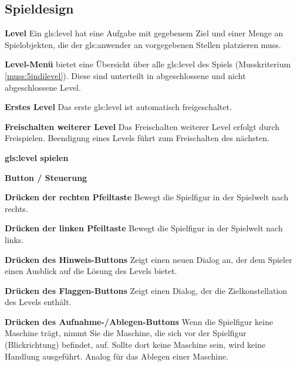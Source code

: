 \documentclass{scrartcl}
\begin{document}
\subsection{Spieldesign}

\begin{falist}[resume]
	\item \label{fa:level} \textbf{Level} Ein \gls{gls:level} hat eine Aufgabe mit gegebenem Ziel und einer Menge an Spielobjekten, die der \gls{gls:anwender} an vorgegebenen Stellen platzieren muss.
	\item \label{fa:levelmenue} \textbf{Level-Menü} bietet eine Übersicht über alle \gls{gls:level} des Spiels (Musskriterium \ref{muss:5indilevel}). Diese sind unterteilt in abgeschlossene und nicht abgeschlossene Level.
    \begin{falist}
        \item \textbf{Erstes Level} Das erste \gls{gls:level} ist automatisch freigeschaltet.
        \item \textbf{Freischalten weiterer Level} Das Freischalten weiterer Level erfolgt durch Freispielen. Beendigung eines Levels führt zum Freischalten des nächsten.
    \end{falist}
    \item \label{fa:spielen} \textbf{\gls{gls:level} spielen}
    \item \label{fa:buttons_muss} \textbf{Button / Steuerung}
    \begin{falist}
    	\item \label{fa:button_rechts_kreuz} \textbf{Drücken der rechten Pfeiltaste} Bewegt die Spielfigur in der Spielwelt nach rechts.
    	\item \label{fa:button_links_kreuz} \textbf{Drücken der linken Pfeiltaste} Bewegt die Spielfigur in der Spielwelt nach links.
    	\item \label{fa:button_lampe} \textbf{Drücken des Hinweis-Buttons} Zeigt einen neuen Dialog an, der dem Spieler einen Ausblick auf die Lösung des Levels bietet.
    	\item \label{fa:button_flagge} \textbf{Drücken des Flaggen-Buttons} Zeigt einen Dialog, der die Zielkonstellation des Levels enthält.
    	\item \label{fa:button_aufnehmen_ablegen} \textbf{Drücken des Aufnahme-/Ablegen-Buttons} Wenn die Spielfigur keine Maschine trägt, nimmt Sie die Maschine, die sich vor der Spielfigur (Blickrichtung) befindet, auf. Sollte dort keine Maschine sein, wird keine Handlung ausgeführt. Analog für das Ablegen einer Maschine.

\end{falist}
\end{falist}
\end{document}
